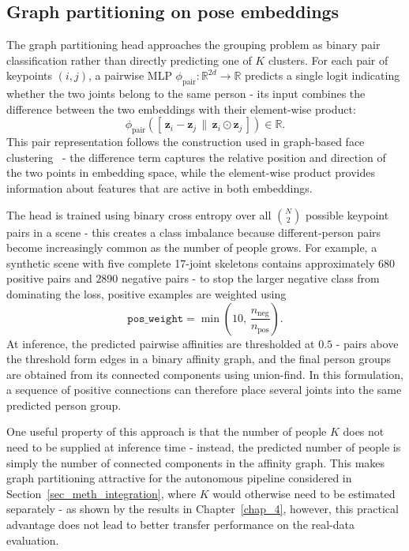 \subsection{Graph partitioning on pose embeddings}
\label{sec_meth_partition_pose}

The graph partitioning head approaches the grouping problem
as binary pair classification rather than directly predicting one of $K$ clusters.
For each pair of keypoints $(i,j)$,
a pairwise MLP $\phi_{\text{pair}} : \mathbb{R}^{2d} \to \mathbb{R}$ predicts a single logit
indicating whether the two joints belong to the same person -
its input combines the difference between the two embeddings with their element-wise product:
\begin{equation}
    \phi_{\text{pair}}\!\left(
    [\,\mathbf{z}_i - \mathbf{z}_j
    \,\big\|\,
    \mathbf{z}_i \odot \mathbf{z}_j\,]
    \right)
    \in \mathbb{R}.
    \label{eq:partition_pair}
\end{equation}
This pair representation follows the construction used in
graph-based face clustering~\cite{yang2020gcnve} -
the difference term captures the relative position and direction of the two points in embedding space,
while the element-wise product provides information about features that are active in both embeddings.

The head is trained using binary cross entropy
over all $\binom{N}{2}$ possible keypoint pairs in a scene -
this creates a class imbalance
because different-person pairs become increasingly common as the number of people grows.
For example,
a synthetic scene with five complete 17-joint skeletons
contains approximately $680$ positive pairs and $2890$ negative pairs -
to stop the larger negative class from dominating the loss,
positive examples are weighted using
\begin{equation}
    \texttt{pos\_weight}
    =
    \min\left(
        10,\,
        \frac{n_{\text{neg}}}{n_{\text{pos}}}
    \right).
\end{equation}
At inference,
the predicted pairwise affinities are thresholded at $0.5$ -
pairs above the threshold form edges in a binary affinity graph,
and the final person groups are obtained from its connected components using union-find.
In this formulation,
a sequence of positive connections can therefore place several joints
into the same predicted person group.

One useful property of this approach
is that the number of people $K$ does not need to be supplied at inference time -
instead,
the predicted number of people is simply the number of connected components in the affinity graph.
This makes graph partitioning attractive
for the autonomous pipeline considered in Section~\ref{sec_meth_integration},
where $K$ would otherwise need to be estimated separately -
as shown by the results in Chapter~\ref{chap_4}, however,
this practical advantage does not lead to better transfer performance on the real-data evaluation.

